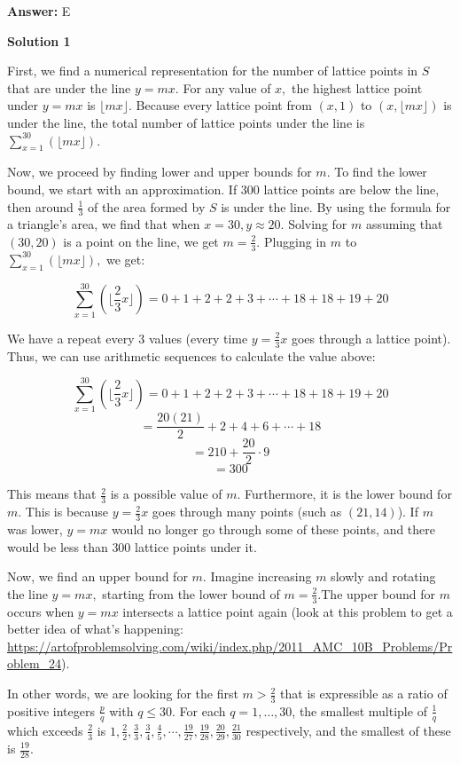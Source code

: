 \begin{enumerate}
 \textbf{Answer: }E



\textbf{Solution 1}

First, we find a numerical representation for the number of lattice points in $S$ that are under the line $y=mx.$ For any value of $x,$ the highest lattice point under $y=mx$ is $\lfloor mx \rfloor.$ Because every lattice point from $(x, 1)$ to $(x, \lfloor mx \rfloor)$ is under the line, the total number of lattice points under the line is $\sum_{x=1}^{30}(\lfloor mx \rfloor).$

 
Now, we proceed by finding lower and upper bounds for $m.$ To find the lower bound, we start with an approximation. If $300$ lattice points are below the line, then around $\frac{1}{3}$ of the area formed by $S$ is under the line. By using the formula for a triangle's area, we find that when $x=30, y \approx 20.$ Solving for $m$ assuming that $(30, 20)$ is a point on the line, we get $m = \frac{2}{3}.$ Plugging in $m$ to $\sum_{x=1}^{30}(\lfloor mx \rfloor),$ we get:

 
 \[\sum_{x=1}^{30}(\lfloor \frac{2}{3}x \rfloor) = 0 + 1 + 2 + 2 + 3 + \cdots + 18 + 18 + 19 + 20\]

 We have a repeat every $3$ values (every time $y=\frac{2}{3}x$ goes through a lattice point). Thus, we can use arithmetic sequences to calculate the value above:

 
 \[\sum_{x=1}^{30}(\lfloor \frac{2}{3}x \rfloor) = 0 + 1 + 2 + 2 + 3 + \cdots + 18 + 18 + 19 + 20\]
 \[=\frac{20(21)}{2} + 2 + 4 + 6 + \cdots + 18\]
 \[=210 + \frac{20}{2}\cdot 9\]
 \[=300\]

 This means that $\frac{2}{3}$ is a possible value of $m.$ Furthermore, it is the lower bound for $m.$ This is because $y=\frac{2}{3}x$ goes through many points (such as $(21, 14)$). If $m$ was lower, $y=mx$ would no longer go through some of these points, and there would be less than $300$ lattice points under it.

 Now, we find an upper bound for $m.$ Imagine increasing $m$ slowly and rotating the line $y=mx,$ starting from the lower bound of $m=\frac{2}{3}.$The upper bound for $m$ occurs when $y=mx$ intersects a lattice point again (look at this problem to get a better idea of what's happening: \href{https://artofproblemsolving.com/wiki/index.php/2011\_AMC\_10B\_Problems/Problem\_24}{https://artofproblemsolving.com/wiki/index.php/2011\_AMC\_10B\_Problems/Problem\_24}).

 In other words, we are looking for the first $m > \frac{2}{3}$ that is expressible as a ratio of positive integers $\frac{p}{q}$ with $q \le 30.$ For each $q=1,\dots,30$, the smallest multiple of $\frac{1}{q}$ which exceeds $\frac{2}{3}$ is $1, \frac{2}{2}, \frac{3}{3}, \frac{3}{4}, \frac{4}{5}, \cdots , \frac{19}{27}, \frac{19}{28}, \frac{20}{29}, \frac{21}{30}$ respectively, and the smallest of these is $\frac{19}{28}.$


\end{enumerate}
